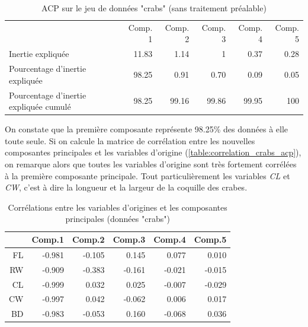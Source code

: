 \documentclass[a4paper,10pt]{report}
\begin{document}
\begin{table}[H]
	\centering
	\captionsetup{justification=centering, margin=2cm}
	\caption{ACP sur le jeu de données "crabs" (sans traitement préalable)}
	\label{table:acp_crabs_initial_data}
	\begin{tabular}{lrrrrr}
		& Comp. 1 & Comp. 2 & Comp. 3 & Comp. 4 & Comp. 5 \\
		Inertie expliquée & 11.83 & 1.14 & 1 & 0.37 & 0.28 \\
		Pourcentage d'inertie expliquée & 98.25 & 0.91 & 0.70 & 0.09 & 0.05 \\
		Pourcentage d'inertie expliquée cumulé & 98.25 & 99.16 & 99.86 & 99.95 & 100
	\end{tabular}
\end{table}

On constate que la première composante représente 98.25\% des données à elle toute seule. Si on calcule la matrice de corrélation entre les nouvelles composantes principales et les variables d'origine (\autoref{table:correlation_crabs_acp}), on remarque alors que toutes les variables d'origine sont très fortement corrélées à la première composante principale.
Tout particulièrement les variables \textit{CL} et \textit{CW}, c'est à dire la longueur et la largeur de la coquille des crabes.

\begin{table}[H]
	\centering
	\captionsetup{justification=centering, margin=2cm}
	\caption{Corrélations entre les variables d'origines et les composantes principales (données "crabs")}
	\label{table:correlation_crabs_acp}
	\begin{tabular}{r|rrrrr}
		& Comp.1 & Comp.2 & Comp.3 & Comp.4 & Comp.5 \\ 
		\hline
		FL & -0.981 & -0.105 & 0.145 & 0.077 & 0.010 \\ 
		RW & -0.909 & -0.383 & -0.161 & -0.021 & -0.015 \\ 
		CL & -0.999 & 0.032 & 0.025 & -0.007 & -0.029 \\ 
		CW & -0.997 & 0.042 & -0.062 & 0.006 & 0.017 \\ 
		BD & -0.983 & -0.053 & 0.160 & -0.068 & 0.036 \\ 
	\end{tabular}
\end{table}
\end{document}
